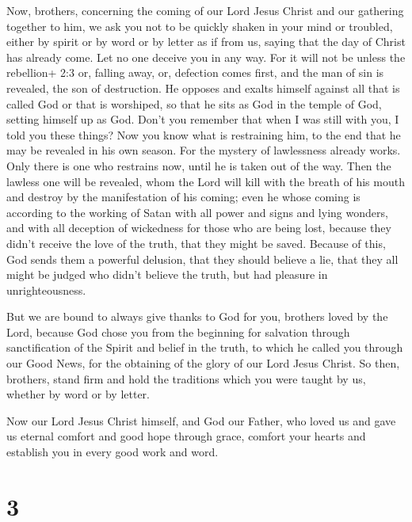  Now, brothers, concerning the coming of our Lord Jesus
Christ and our gathering together to him, we ask you  not to
be quickly shaken in your mind or troubled, either by spirit or by word
or by letter as if from us, saying that the day of Christ has already
come.  Let no one deceive you in any way. For it will not be
unless the rebellion+ 2:3 or, falling away, or, defection comes first,
and the man of sin is revealed, the son of destruction.  He
opposes and exalts himself against all that is called God or that is
worshiped, so that he sits as God in the temple of God, setting himself
up as God.  Don't you remember that when I was still with
you, I told you these things?  Now you know what is
restraining him, to the end that he may be revealed in his own season.
 For the mystery of lawlessness already works. Only there is
one who restrains now, until he is taken out of the way. 
Then the lawless one will be revealed, whom the Lord will kill with the
breath of his mouth and destroy by the manifestation of his coming;
 even he whose coming is according to the working of Satan
with all power and signs and lying wonders,  and with all
deception of wickedness for those who are being lost, because they
didn't receive the love of the truth, that they might be saved.
 Because of this, God sends them a powerful delusion, that
they should believe a lie,  that they all might be judged
who didn't believe the truth, but had pleasure in unrighteousness.

 But we are bound to always give thanks to God for you,
brothers loved by the Lord, because God chose you from the beginning for
salvation through sanctification of the Spirit and belief in the truth,
 to which he called you through our Good News, for the
obtaining of the glory of our Lord Jesus Christ.  So then,
brothers, stand firm and hold the traditions which you were taught by
us, whether by word or by letter.

 Now our Lord Jesus Christ himself, and God our Father, who
loved us and gave us eternal comfort and good hope through grace,
 comfort your hearts and establish you in every good work
and word.

\hypertarget{section-2}{%
\section{3}\label{section-2}}

